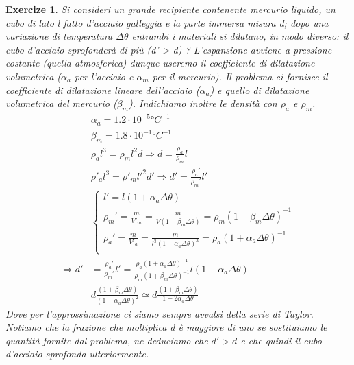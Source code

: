 \documentclass[10pt,a4paper]{article}
\newtheorem{exercize}{Exercize}
\begin{document}
\begin{exercize}
Si consideri un grande recipiente contenente mercurio liquido, un cubo di lato l fatto d'acciaio galleggia e la parte immersa misura d; dopo una variazione di temperatura $\Delta \theta$ entrambi i materiali si dilatano, in modo diverso: il cubo d'acciaio sprofonderà di più (d' > d) ? L'espansione avviene a pressione costante (quella atmosferica) dunque useremo il coefficiente di dilatazione volumetrica ($\alpha_a$ per l'acciaio e $\alpha_m$ per il mercurio). Il problema ci fornisce il coefficiente di dilatazione lineare dell'acciaio ($\alpha_a$) e quello di dilatazione volumetrica del mercurio ($\beta_m$). Indichiamo inoltre le densità con $\rho_a$ e $\rho_m$.
\begin{align*}
	&\alpha_a = 1.2 \cdot 10^{-5} °C^{-1}\\
	&\beta_m = 1.8 \cdot 10^{-1} °C^{-1}\\
	&\rho_a l^3 = \rho_m l^2 d \Rightarrow d = \frac{\rho_a}{\rho_m} l\\
	&\rho'_a l^3 = \rho'_m l'^2 d' \Rightarrow d' = \frac{\rho_a'}{\rho_m'} l'\\
	&\begin{cases}
		l' = l (1 + \alpha_a \Delta \theta)\\
		\rho_m' = \frac{m }{V'_m} = \frac{m}{V (1 + \beta_m \Delta \theta)} = \rho_m (1 + \beta_m \Delta \theta)^{-1}\\
		\rho_a' = \frac{m }{V'_a} = \frac{m}{l^3 (1 + \alpha_a \Delta \theta)^3} = \rho_a (1 + \alpha_a \Delta \theta)^{-1}\\
	\end{cases}\\
	\Rightarrow d' &= \frac{\rho_a'}{\rho_m'} l' = \frac{\rho_a (1 + \alpha_a \Delta \theta)^{-1}}{\rho_m (1 + \beta_m \Delta \theta)^{-1}} l (1 + \alpha_a \Delta \theta)\\
	&d \frac{(1 + \beta_m \Delta \theta)}{(1 + \alpha_a \Delta \theta)^2}\simeq d \frac{(1 + \beta_m  \Delta \theta)}{1+2 \alpha_a \Delta \theta}
\end{align*} 
Dove per l'approssimazione ci siamo sempre avvalsi della serie di Taylor. Notiamo che la frazione che moltiplica d è maggiore di uno se sostituiamo le quantità fornite dal problema, ne deduciamo che $d' > d$ e che quindi il cubo d'acciaio sprofonda ulteriormente. 
\end{exercize} 
\end{document}
